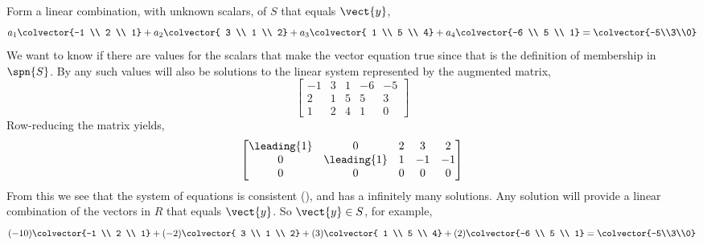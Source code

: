 Form a linear combination, with unknown scalars, of $S$ that equals $\vect{y}$,
%
\begin{equation*}
a_1\colvector{-1 \\ 2 \\ 1}+
a_2\colvector{ 3 \\ 1 \\ 2}+
a_3\colvector{ 1 \\ 5 \\ 4}+
a_4\colvector{-6 \\ 5 \\ 1}
=
\colvector{-5\\3\\0}
\end{equation*}
%
We want to know if there are values for the scalars that make the vector equation true since that is the definition of membership in $\spn{S}$.  By  any such values will also be solutions to the linear system represented by the augmented matrix,
%
\begin{equation*}
\begin{bmatrix}
 -1 & 3 & 1 & -6 & -5 \\
 2 & 1 & 5 & 5 & 3 \\
 1 & 2 & 4 & 1 & 0
\end{bmatrix}
\end{equation*}
%
Row-reducing the matrix yields,
%
\begin{equation*}
\begin{bmatrix}
 \leading{1} & 0 & 2 & 3 & 2 \\
 0 & \leading{1} & 1 & -1 & -1 \\
 0 & 0 & 0 & 0 & 0
\end{bmatrix}
\end{equation*}
%
From this we  see that the system of equations is consistent (), and has a infinitely many solutions.  Any solution will provide a linear combination of the vectors in $R$ that equals $\vect{y}$. So $\vect{y}\in S$, for example,
%
\begin{equation*}
(-10)\colvector{-1 \\ 2 \\ 1}+
(-2)\colvector{ 3 \\ 1 \\ 2}+
(3)\colvector{ 1 \\ 5 \\ 4}+
(2)\colvector{-6 \\ 5 \\ 1}
=
\colvector{-5\\3\\0}
\end{equation*}